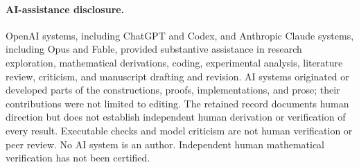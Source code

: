 \documentclass[10pt]{article}
\begin{document}
\paragraph{AI-assistance disclosure.}
OpenAI systems, including ChatGPT and Codex, and Anthropic Claude systems, including Opus and Fable, provided substantive assistance in research exploration, mathematical derivations, coding, experimental analysis, literature review, criticism, and manuscript drafting and revision. AI systems originated or developed parts of the constructions, proofs, implementations, and prose; their contributions were not limited to editing. The retained record documents human direction but does not establish independent human derivation or verification of every result. Executable checks and model criticism are not human verification or peer review. No AI system is an author. Independent human mathematical verification has not been certified.


\begingroup\small


\endgroup
\end{document}
